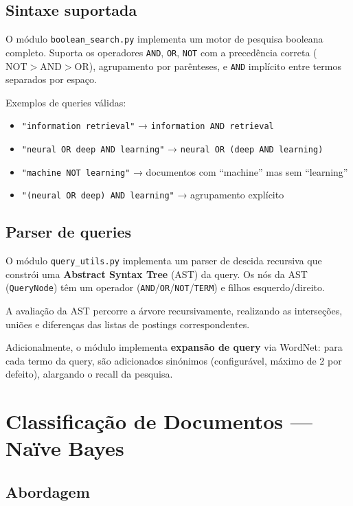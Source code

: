 \documentclass[12pt,a4paper]{article}
\begin{document}
\subsection{Sintaxe suportada}

O módulo \texttt{boolean\_search.py} implementa um motor de pesquisa booleana completo. Suporta os operadores \texttt{AND}, \texttt{OR}, \texttt{NOT} com a precedência correta ($\text{NOT} > \text{AND} > \text{OR}$), agrupamento por parênteses, e \texttt{AND} implícito entre termos separados por espaço.

Exemplos de queries válidas:
\begin{itemize}
    \item \texttt{"information retrieval"} → \texttt{information AND retrieval}
    \item \texttt{"neural OR deep AND learning"} → \texttt{neural OR (deep AND learning)}
    \item \texttt{"machine NOT learning"} → documentos com ``machine'' mas sem ``learning''
    \item \texttt{"(neural OR deep) AND learning"} → agrupamento explícito
\end{itemize}

\subsection{Parser de queries}

O módulo \texttt{query\_utils.py} implementa um parser de descida recursiva que constrói uma \textbf{Abstract Syntax Tree} (AST) da query. Os nós da AST (\texttt{QueryNode}) têm um operador (\texttt{AND}/\texttt{OR}/\texttt{NOT}/\texttt{TERM}) e filhos esquerdo/direito.

A avaliação da AST percorre a árvore recursivamente, realizando as interseções, uniões e diferenças das listas de postings correspondentes.

Adicionalmente, o módulo implementa \textbf{expansão de query} via WordNet: para cada termo da query, são adicionados sinónimos (configurável, máximo de 2 por defeito), alargando o recall da pesquisa.

\section{Classificação de Documentos --- Naïve Bayes}

\subsection{Abordagem}
\end{document}
